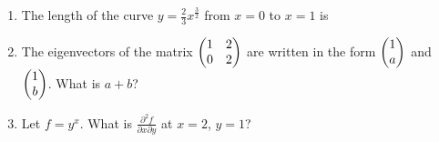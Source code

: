 \documentclass[journal,12pt,onecolumn]{IEEEtran}
\begin{document}
\begin{enumerate}
          \begin{enumerate}
          \end{enumerate}

    \item The length of the curve $y=\frac{2}{3}x^{\frac{3}{2}}$ from $x=0$ to $x=1$ is\\

          \begin{enumerate}
          \end{enumerate}

    \item The eigenvectors of the matrix $\begin{pmatrix}1 & 2 \\0 & 2\end{pmatrix}$ are written in the form $\begin{pmatrix}1 \\a\end{pmatrix}$ and $\begin{pmatrix}1 \\b\end{pmatrix}$. What is $a+b$?

          \begin{enumerate}
          \end{enumerate}

    \item Let $f = y^x$. What is $\frac{\partial^2 f}{\partial{x}\partial{y}}$ at $x=2$, $y=1$?\\

          \begin{enumerate}
          \end{enumerate}


\end{enumerate}
\end{document}
